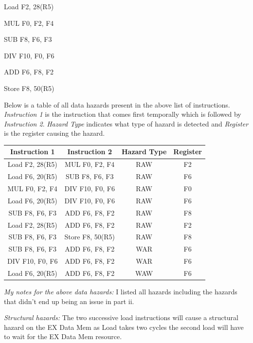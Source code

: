 \documentclass[a4paper, 11pt]{exam}
\begin{document}
\begin{center}
\begin{enumerate}
\begin{enumerate}
\begin {center}
Load F2, 28(R5)

MUL F0, F2, F4

SUB F8, F6, F3

DIV F10, F0, F6

ADD F6, F8, F2

Store F8, 50(R5)

\end {center}
 
Below is a table of all data hazards present in the above list of instructions. \textit{Instruction 1} is the instruction that comes first temporally which is followed by \textit{Instruction 2}. \textit{Hazard Type} indicates what type of hazard is detected and \textit{Register} is the register causing the hazard.

\begin{center}
\begin{tabular}{ |c|c|c|c| } 
 \hline
  \textbf{Instruction 1} & \textbf{Instruction 2} & \textbf{Hazard Type} & \textbf{Register} \\ 
  \hline
 Load F2, 28(R5) & MUL F0, F2, F4 & RAW & F2\\ \hline
 Load F6, 20(R5) & SUB F8, F6, F3 & RAW & F6\\ \hline
 MUL F0, F2, F4 & DIV F10, F0, F6 & RAW & F0 \\ \hline
 Load F6, 20(R5) & DIV F10, F0, F6 & RAW & F6 \\ \hline
 SUB F8, F6, F3 & ADD F6, F8, F2 & RAW & F8\\ \hline
 Load F2, 28(R5) & ADD F6, F8, F2 & RAW & F2\\ \hline
 SUB F8, F6, F3 & Store F8, 50(R5) & RAW & F8\\ \hline
 SUB F8, F6, F3 & ADD F6, F8, F2 & WAR & F6\\ \hline
 DIV F10, F0, F6 & ADD F6, F8, F2 & WAR & F6\\ \hline
 Load F6, 20(R5) & ADD F6, F8, F2 & WAW & F6\\ \hline
\end{tabular}
\end{center}

\textit{My notes for the above data hazards:} I listed all hazards including the hazards that didn't end up being an issue in part ii.

\textit{Structural hazards:} The two successive load instructions will cause a structural hazard on the EX Data Mem as Load takes two cycles the second load will have to wait for the EX Data Mem resource.

\hfill


\end{enumerate}
\end{enumerate}
\end{center}
\end{document}
